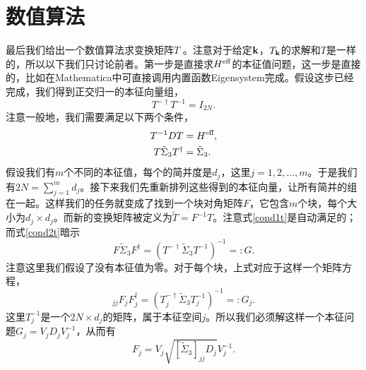 \section{数值算法}
最后我们给出一个数值算法求变换矩阵$T$ \cite{Maestro2004}。注意对于给定$\vb k$，$T_{\vb k}$的求解和$T$是一样的，所以以下我们只讨论前者。第一步是直接求$H^{\text{eff}}$的本征值问题，这一步是直接的，比如在Mathematica中可直接调用内置函数Eigensystem完成。假设这步已经完成，我们得到正交归一的本征向量组，
\begin{equation}
  T^{-\dagger} T^{-1} = I_{2N}.
\end{equation}
注意一般地，我们需要满足以下两个条件，
\begin{subequations}
    \begin{align}
        T^{-1} DT &=H^{\text{eff}},\label{cond1t} \\
        T\tilde \Sigma_3 T^\dagger &= \tilde \Sigma_3.\label{cond2t}
    \end{align}
\end{subequations}
假设我们有$m$个不同的本征值，每个的简并度是$d_j$，这里$j=1,2,\dots,m$。于是我们有$2N=\sum_{j=1}^m d_j$。接下来我们先重新排列这些得到的本征向量，让所有简并的组在一起。这样我们的任务就变成了找到一个块对角矩阵$F$，它包含$m$个块，每个大小为$d_j\times d_j$。而新的变换矩阵被定义为$\tilde T= F^{-1} T$。注意式\eqref{cond1t}是自动满足的；而式\eqref{cond2t}暗示
\begin{equation}
  F\tilde \Sigma_3 F^\dagger = (T^{-\dagger} \tilde \Sigma_3 T^{-1})^{-1} =: G.
\end{equation}
注意这里我们假设了没有本征值为零。对于每个块，上式对应于这样一个矩阵方程，
\begin{equation}
  [\tilde \Sigma_3]_{jj} F_j F^\dagger_j = (T_j^{-\dagger} \tilde \Sigma_3 T_j^{-1} )^{-1} =: G_j.
\end{equation}
这里$T_j^{-1}$是一个$2N\times d_j$的矩阵，属于本征空间$j$。所以我们必须解这样一个本征问题$G_j = V_j D_j V^{-1}_j$，从而有
\begin{equation}
  F_j = V_j \sqrt{[\tilde \Sigma_3]_{jj} D_j} V_j^{-1}.
\end{equation}














